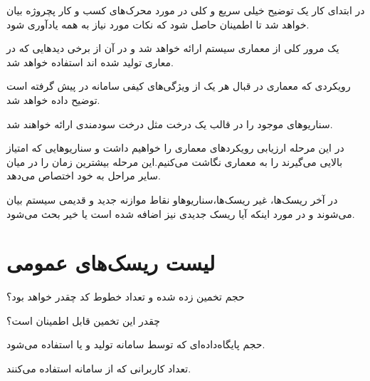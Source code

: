 \begin{itemize}

	

	 در ابتدای کار یک توضیح خیلی سریع و کلی در مورد محرک‌های کسب و کار پچروژه بیان خواهد شد تا اطمینان حاصل شود که نکات مورد نیاز به همه یادآوری شود.

	

	 یک مرور کلی از معماری سیستم ارائه خواهد شد و در آن از برخی دید‌هایی که در معاری تولید شده اند استفاده خواهد شد.

	

	 رویکردی که معماری در قبال هر یک از ویژگی‌های کیفی سامانه در پیش گرفته است توضیح داده خواهد شد.

	

	 سناریوهای موجود را در قالب یک درخت مثل درخت سودمندی ارائه خواهند شد.



	 در این مرحله ارزیابی رویکردهای معماری را خواهیم داشت و سناریوهایی که امتیاز بالایی می‌گیرند را به معماری نگاشت می‌کنیم.این مرحله بیشترین زمان را در میان سایر مراحل به خود اختصاص می‌دهد.

	 در آخر ریسک‌ها، غیر ریسک‌ها،سناریوهاو نقاط موازنه جدید و قدیمی سیستم بیان می‌شوند و در مورد اینکه آیا ریسک جدیدی نیز اضافه شده است یا خیر بحث می‌شود.

	 

\end{itemize}

\section{لیست ریسک‌های عمومی}




\begin{itemize}

	

	 حجم تخمین زده شده و تعداد خطوط کد چقدر خواهد بود؟

	

	 چقدر این تخمین قابل اطمینان است؟

	

	 حجم پایگاه‌داده‌ای که توسط سامانه تولید و یا استفاده می‌شود.

	 تعداد کاربرانی که از سامانه استفاده می‌کنند.

	

\end{itemize}



